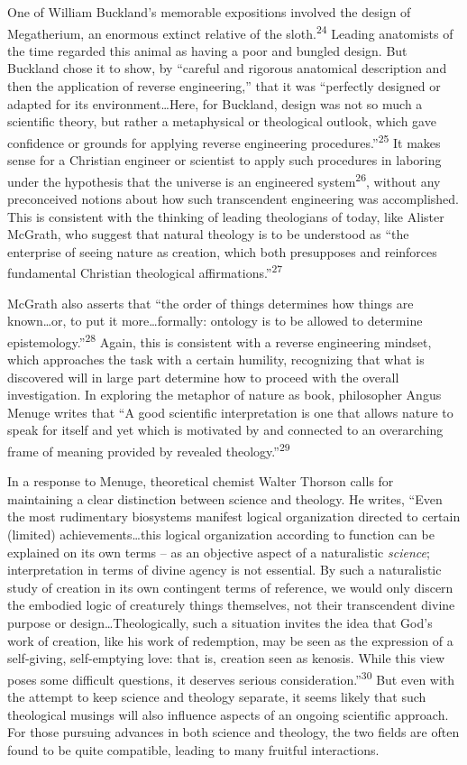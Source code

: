 One of William Buckland’s memorable expositions involved the design of
Megatherium, an enormous extinct relative of the
sloth.\textsuperscript{24} Leading anatomists of the time regarded this
animal as having a poor and bungled design. But Buckland chose it to
show, by “careful and rigorous anatomical description and then the
application of reverse engineering,” that it was “perfectly designed or
adapted for its environment…Here, for Buckland, design was not so much
a scientific theory, but rather a metaphysical or theological outlook,
which gave confidence or grounds for applying reverse engineering
procedures.”\textsuperscript{25} It makes sense for a Christian
engineer or scientist to apply such procedures in laboring under the
hypothesis that the universe is an engineered
system\textsuperscript{26}, without any preconceived notions about how
such transcendent engineering was accomplished. This is consistent with
the thinking of leading theologians of today, like Alister McGrath, who
suggest that natural theology is to be understood as “the enterprise of
seeing nature as creation, which both presupposes and reinforces
fundamental Christian theological affirmations.”\textsuperscript{27}


McGrath also asserts that “the order of things determines how things are
known…or, to put it more…formally: ontology is to be allowed to
determine epistemology.”\textsuperscript{28} Again, this is consistent
with a reverse engineering mindset, which approaches the task with a
certain humility, recognizing that what is discovered will in large
part determine how to proceed with the overall investigation. In
exploring the metaphor of nature as book, philosopher Angus Menuge
writes that “A good scientific interpretation is one that allows nature
to speak for itself and yet which is motivated by and connected to an
overarching frame of meaning provided by revealed
theology.”\textsuperscript{29}


In a response to Menuge, theoretical chemist Walter Thorson calls for
maintaining a clear distinction between science and theology. He
writes, “Even the most rudimentary biosystems manifest logical
organization directed to certain (limited) achievements…this logical
organization according to function can be explained on its own terms –
as an objective aspect of a naturalistic \textit{science};
interpretation in terms of divine agency is not essential. By such a
naturalistic study of creation in its own contingent terms of
reference, we would only discern the embodied logic of creaturely
things themselves, not their transcendent divine purpose or
design…Theologically, such a situation invites the idea that God’s work
of creation, like his work of redemption, may be seen as the expression
of a self-giving, self-emptying love: that is, creation seen as
kenosis. While this view poses some difficult questions, it deserves
serious consideration.”\textsuperscript{30} But even with the attempt
to keep science and theology separate, it seems likely that such
theological musings will also influence aspects of an ongoing
scientific approach. For those pursuing advances in both science and
theology, the two fields are often found to be quite compatible,
leading to many fruitful interactions.

